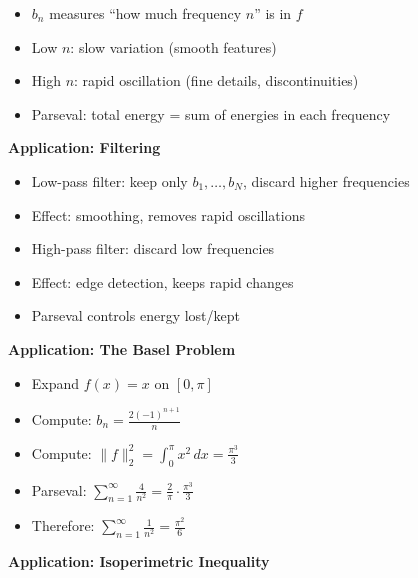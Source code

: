 \documentclass[
  10pt,
  letterpaper,
]{scrbook}
\providecommand{\tightlist}{%
  \setlength{\itemsep}{0pt}\setlength{\parskip}{0pt}}
\begin{document}
\begin{itemize}
\tightlist
\item
  \(b_n\) measures ``how much frequency \(n\)'' is in \(f\)
\item
  Low \(n\): slow variation (smooth features)
\item
  High \(n\): rapid oscillation (fine details, discontinuities)
\item
  Parseval: total energy = sum of energies in each frequency
\end{itemize}

\textbf{Application: Filtering}

\begin{itemize}
\tightlist
\item
  Low-pass filter: keep only \(b_1, \ldots, b_N\), discard higher
  frequencies
\item
  Effect: smoothing, removes rapid oscillations
\item
  High-pass filter: discard low frequencies
\item
  Effect: edge detection, keeps rapid changes
\item
  Parseval controls energy lost/kept
\end{itemize}

\textbf{Application: The Basel Problem}

\begin{itemize}
\tightlist
\item
  Expand \(f(x) = x\) on \([0, \pi]\)
\item
  Compute: \(b_n = \frac{2(-1)^{n+1}}{n}\)
\item
  Compute: \(\|f\|_2^2 = \int_0^\pi x^2\, dx = \frac{\pi^3}{3}\)
\item
  Parseval:
  \(\sum_{n=1}^\infty \frac{4}{n^2} = \frac{2}{\pi} \cdot \frac{\pi^3}{3}\)
\item
  Therefore: \(\sum_{n=1}^\infty \frac{1}{n^2} = \frac{\pi^2}{6}\)
\end{itemize}

\textbf{Application: Isoperimetric Inequality}
\end{document}
